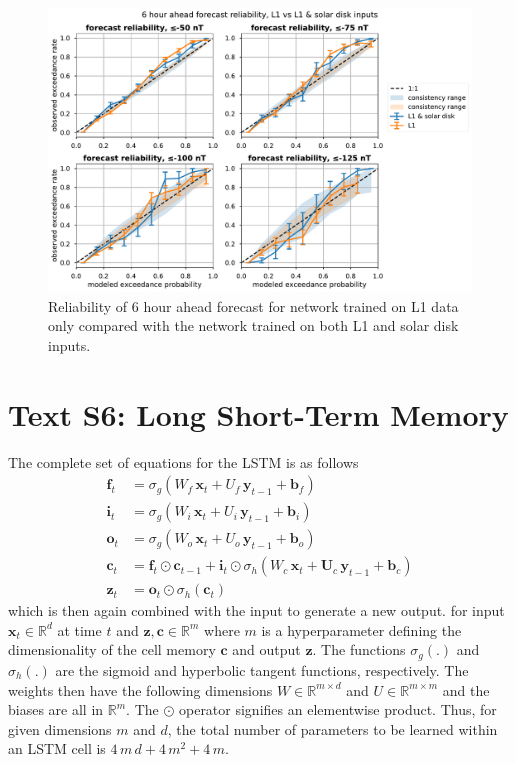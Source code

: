 \documentclass{agujournal2018}
\begin{document}
\begin{figure}[htbp]
   \centering
   \includegraphics[width=1\textwidth]{figures/supplement/est_forecast_reliability_L1vsL1&solardisk_t+6.pdf}
   \caption{Reliability of 6 hour ahead forecast for network trained on L1 data only compared with the network trained on both L1 and solar disk inputs.}
   \label{fig:reliability_input}
\end{figure}

\section*{Text S6: Long Short-Term Memory}

The complete set of equations for the LSTM is as follows
\begin{eqnarray*}
\mathbf{f}_t &= \sigma_g(W_f\,\mathbf{x}_t +U_f\,\mathbf{y}_{t-1} + \mathbf{b}_f) \\
\mathbf{i}_t &= \sigma_g(W_i\,\mathbf{x}_t + U_i\,\mathbf{y}_{t-1} + \mathbf{b}_i) \\
\mathbf{o}_t &= \sigma_g(W_o\,\mathbf{x}_t + U_o\,\mathbf{y}_{t-1} + \mathbf{b}_o) \\
\mathbf{c}_t &= \mathbf{f}_t \odot \mathbf{c}_{t-1} + \mathbf{i}_t \odot \sigma_h(W_c\,\mathbf{x}_t + \mathbf{U}_c\,\mathbf{y}_{t-1} + \mathbf{b}_c) \\
\mathbf{z}_t &= \mathbf{o}_t \odot \sigma_h(\mathbf{c}_t)
\end{eqnarray*}
which is then again combined with the input to generate a new output.
for input $\mathbf{x}_t \in \mathbb{R}^d$ at time $t$ and $\mathbf{z}, \mathbf{c} \in \mathbb{R}^m$ where $m$ is a hyperparameter defining the dimensionality of the cell memory $\mathbf{c}$ and output $\mathbf{z}$. The functions $\sigma_g(.)$ and $\sigma_h(.)$ are the sigmoid and hyperbolic tangent functions, respectively. The weights then have the following dimensions $W \in \mathbb{R}^{m\times d}$ and  $U \in \mathbb{R}^{m\times m}$ and the biases are all in $\mathbb{R}^m$. The $\odot$ operator signifies an elementwise product. Thus, for given dimensions $m$ and $d$, the total number of parameters to be learned within an LSTM cell is $4\,m\,d + 4\,m^2 + 4\,m$.
\end{document}

